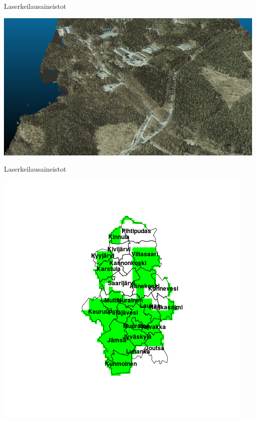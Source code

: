 \documentclass{beamer}
\begin{document}
\begin{frame}{Laserkeilausaineistot}
  \begin{center}
    \includegraphics[width=\textwidth]{laasereita.png}
  \end{center}
\end{frame}

\begin{frame}{Laserkeilausaineistot}
  \begin{center}
    \includegraphics[height=0.9\textheight]{laserkattavuus.png}
  \end{center}
\end{frame}
\end{document}
